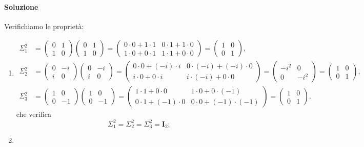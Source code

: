 \documentclass{article}
\theoremstyle{plain}
\theoremstyle{definition}
\theoremstyle{remark}
\begin{document}
\paragraph{Soluzione}
Verifichiamo le proprietà:
\begin{enumerate}
    \item \begin{align*}
        \Sigma_1^2 &= \begin{pmatrix} 0 & 1 \\ 1 & 0 \end{pmatrix}\begin{pmatrix} 0 & 1 \\ 1 & 0 \end{pmatrix}
                   = \begin{pmatrix} 0\cdot0+1\cdot1 & 0\cdot1+1\cdot0 \\[1ex] 1\cdot0+0\cdot1 & 1\cdot1+0\cdot0 \end{pmatrix}
                   = \begin{pmatrix} 1 & 0 \\ 0 & 1 \end{pmatrix},\\[2ex]
        \Sigma_2^2 &= \begin{pmatrix} 0 & -i \\ i & 0 \end{pmatrix}\begin{pmatrix} 0 & -i \\ i & 0 \end{pmatrix}
                   = \begin{pmatrix} 0\cdot0+(-i)\cdot i & 0\cdot(-i)+(-i)\cdot0 \\[1ex] i\cdot0+0\cdot i & i\cdot(-i)+0\cdot0 \end{pmatrix}
                   = \begin{pmatrix} -i^2 & 0 \\ 0 & -i^2 \end{pmatrix}
                   = \begin{pmatrix} 1 & 0 \\ 0 & 1 \end{pmatrix},\\[2ex]
        \Sigma_3^2 &= \begin{pmatrix} 1 & 0 \\ 0 & -1 \end{pmatrix}\begin{pmatrix} 1 & 0 \\ 0 & -1 \end{pmatrix}
                   = \begin{pmatrix} 1\cdot1+0\cdot0 & 1\cdot0+0\cdot(-1) \\[1ex] 0\cdot1+(-1)\cdot0 & 0\cdot0+(-1)\cdot(-1) \end{pmatrix}
                   = \begin{pmatrix} 1 & 0 \\ 0 & 1 \end{pmatrix}.
        \end{align*}
        che verifica \[\Sigma_1^2=\Sigma_2^2=\Sigma_3^2=\mathbf{I}_2; \]
        \item 
        

\end{enumerate}
\end{document}
